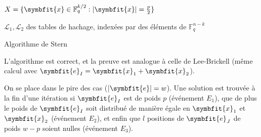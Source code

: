 \documentclass{scrartcl}[a4paper,9pt,headings=small,footinclude=false]
\theoremstyle{definition}
\theoremstyle{remark}
\begin{document}
\begin{algorithm}[H]
    \renewcommand{\algorithmcfname}{Algorithme}%
    \SetAlgoLined
    $X=\{ \symbfit{x}\in\mathbb{F}_q^{k/2} :|\symbfit{x}| =\frac{p}{2} \}$
    
    $\mathcal{L}_1, \mathcal{L}_2$ des tables de hachage, indexées par des éléments de $\mathbb{F}_q^{n-k}$
    
\caption{Algorithme de Stern}
\end{algorithm}

L'algorithme est correct, et la preuve est analogue à celle de Lee-Brickell (même calcul avec $\symbfit{e}_I=\symbfit{x}_1+\symbfit{x}_2$).

On se place dans le pire des cas ($|\symbfit{e}|=w$).
Une solution est trouvée à la fin d'une itération si $\symbfit{e}_I$ est de poids $p$ (événement $E_1$), que de plus le poids de $\symbfit{e}_I$ soit distribué de manière égale en $\symbfit{x}_1$ et $\symbfit{x}_2$ (événement $E_2$), et enfin que $l$ positions de $\symbfit{e}_J$ de poids $w-p$ soient nulles (événement $E_3$).
\end{document}
